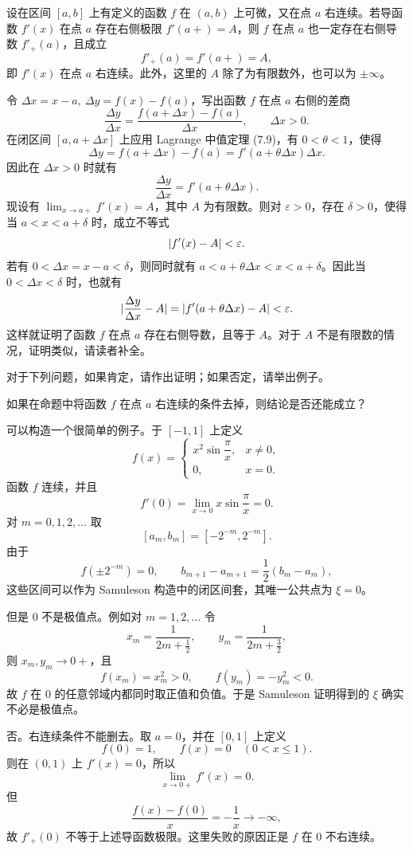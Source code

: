 \begin{xproposition}[7.1.7（单侧导数极限定理）]
设在区间 $[a,b]$ 上有定义的函数 $f$ 在 $(a,b)$ 上可微，又在点 $a$ 右连续。若导函数 $f'(x)$ 在点 $a$ 存在右侧极限 $f'(a+)=A$，则 $f$ 在点 $a$ 也一定存在右侧导数 $f'_+(a)$，且成立
\[
  f'_+(a)=f'(a+)=A,
\]
即 $f'(x)$ 在点 $a$ 右连续。此外，这里的 $A$ 除了为有限数外，也可以为 $\pm\infty$。
\end{xproposition}

\begin{xproof}
令 $\Delta x=x-a,\ \Delta y=f(x)-f(a)$，写出函数 $f$ 在点 $a$ 右侧的差商
\[
  \frac{\Delta y}{\Delta x}=\frac{f(a+\Delta x)-f(a)}{\Delta x},\qquad \Delta x>0.
\]
在闭区间 $[a,a+\Delta x]$ 上应用 Lagrange 中值定理 (7.9)，有 $0<\theta<1$，使得
\[
  \Delta y=f(a+\Delta x)-f(a)=f'(a+\theta\Delta x)\Delta x.
\]
因此在 $\Delta x>0$ 时就有
\[
  \frac{\Delta y}{\Delta x}=f'(a+\theta\Delta x).
\]
现设有 $\lim_{x\to a+}f'(x)=A$，其中 $A$ 为有限数。则对 $\varepsilon>0$，存在 $\delta>0$，使得当 $a<x<a+\delta$ 时，成立不等式
\[
  \lvert f'(x)-A\rvert<\varepsilon.
\]
若有 $0<\Delta x=x-a<\delta$，则同时就有 $a<a+\theta\Delta x<x<a+\delta$。因此当 $0<\Delta x<\delta$ 时，也就有
\[
  \lvert\frac{\Delta y}{\Delta x}-A\rvert=\lvert f'(a+\theta\Delta x)-A\rvert<\varepsilon.
\]
这样就证明了函数 $f$ 在点 $a$ 存在右侧导数，且等于 $A$。对于 $A$ 不是有限数的情况，证明类似，请读者补全。
\end{xproof}

对于下列问题，如果肯定，请作出证明；如果否定，请举出例子。

\begin{xthought}[1]
如果在命题中将函数 $f$ 在点 $a$ 右连续的条件去掉，则结论是否还能成立？
\end{xthought}
\begin{xsolution}
可以构造一个很简单的例子。于 $[-1,1]$ 上定义
\[
  f(x)=
  \begin{cases}
    x^2\sin\dfrac{\pi}{x},&x\neq0,\\
    0,&x=0.
  \end{cases}
\]
函数 $f$ 连续，并且
\[
  f'(0)=\lim_{x\to0}x\sin\frac{\pi}{x}=0.
\]
对 $m=0,1,2,\ldots$ 取
\[
  [a_m,b_m]=[-2^{-m},2^{-m}].
\]
由于
\[
  f(\pm2^{-m})=0,
  \qquad
  b_{m+1}-a_{m+1}=\frac12(b_m-a_m),
\]
这些区间可以作为 Samuleson 构造中的闭区间套，其唯一公共点为 $\xi=0$。

但是 $0$ 不是极值点。例如对 $m=1,2,\ldots$ 令
\[
  x_m=\frac{1}{2m+\frac12},
  \qquad
  y_m=\frac{1}{2m+\frac32},
\]
则 $x_m,y_m\to0+$，且
\[
  f(x_m)=x_m^2>0,
  \qquad
  f(y_m)=-y_m^2<0.
\]
故 $f$ 在 $0$ 的任意邻域内都同时取正值和负值。于是 Samuleson 证明得到的 $\xi$ 确实不必是极值点。

否。右连续条件不能删去。取 $a=0$，并在 $[0,1]$ 上定义
\[
  f(0)=1,
  \qquad
  f(x)=0\quad(0<x\leqslant1).
\]
则在 $(0,1)$ 上 $f'(x)=0$，所以
\[
  \lim_{x\to0+}f'(x)=0.
\]
但
\[
  \frac{f(x)-f(0)}x=-\frac1x\to-\infty,
\]
故 $f'_+(0)$ 不等于上述导函数极限。这里失败的原因正是 $f$ 在 $0$ 不右连续。
\end{xsolution}


